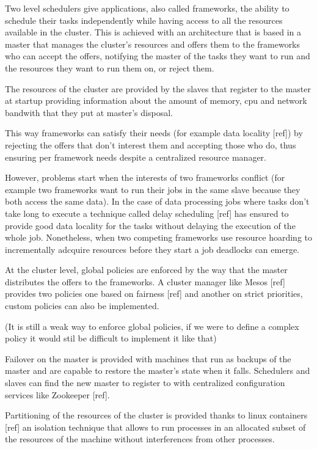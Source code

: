 \documentclass{svjour3}                     %
\begin{document}
Two level schedulers give applications, also called
frameworks, the ability to schedule their tasks independently while
having access to all the resources available in the cluster. This
is achieved with an architecture that is based in a master that manages
the cluster's resources and offers them to the frameworks who can accept 
the offers, notifying the master of the tasks they want to run and the
resources they want to run them on, or reject them.

The resources of the cluster are provided by the slaves that register to 
the master at startup providing information about the amount of memory, cpu
and network bandwith that they put at master's disposal.  

This way frameworks can satisfy their needs (for example data locality [ref]) by 
rejecting the offers that don't interest them and accepting those who do, thus
ensuring per framework needs despite a centralized resource manager. 

However, problems start when the interests of two frameworks conflict 
(for example two frameworks want to run their jobs in the same slave because 
they both access the same data). In the case of data processing jobs where tasks
don't take long to execute a technique called delay scheduling [ref] has ensured to
provide good data locality for the tasks without delaying the execution of the whole
job. Nonetheless, when two competing frameworks use resource hoarding to incrementally 
adcquire resources before they start a job deadlocks can emerge.

At the cluster level, global policies are enforced by the way that the master 
distributes the offers to the frameworks. A cluster manager like Mesos [ref] provides two
policies one based on fairness [ref] and another on strict priorities, custom policies can
also be implemented.

(It is still a weak way to enforce global policies, if we were to define a complex
policy it would stil be difficult to implement it like that)

Failover on the master is provided with machines that run as backups of the master and
are capable to restore the master's state when it falls. Schedulers and slaves can find
the new master to register to with centralized configuration services like Zookeeper [ref].

Partitioning of the resources of the cluster is provided thanks to linux containers [ref]
an isolation technique that allows to run processes in an allocated subset of the 
resources of the machine without interferences from other processes. 
\end{document}
